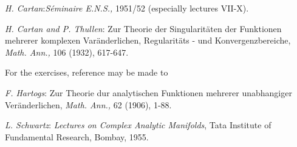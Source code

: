 \begin{thebibliography}{99}
 \textit{H. Cartan}:\pageoriginale \textit{S\'eminaire E.N.S.,}
  1951/52 (especially lectures VII-X).  

 \textit{H. Cartan and P. Thullen}: Zur Theorie der
  Singularit\"aten der Funktionen mehrerer komplexen Var\"anderlichen,
  Regularit\"ats - und Konvergenzbereiche, \textit{Math. Ann.,} 106 (1932),
  617-647. 

For the exercises, reference may be made to

 \textit{F. Hartogs}: Zur Theorie dur analytischen Funktionen
  mehrerer unabhangiger Ver\"anderlichen, \textit{Math. Ann.,} 62
  (1906), 1-88. 

 \textit{L. Schwartz}: \textit{Lectures on Complex Analytic
  Manifolds}, Tata Institute of Fundamental Research, Bombay, 1955. 
\end{thebibliography}
